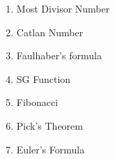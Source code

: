 

\begin{enumerate}
    \normalsize \item Most Divisor Number \par
        \tiny 
    \normalsize \item Catlan Number \par
        \tiny 
    \normalsize \item Faulhaber's formula \par
        \tiny 
    \normalsize \item SG Function \par
        \tiny 
    \normalsize \item Fibonacci \par
        \tiny 
    \normalsize \item Pick's Theorem \par
        \tiny 
    \normalsize \item Euler's Formula \par
        \tiny 
\end{enumerate}